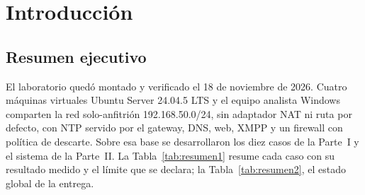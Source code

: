 \chapter{Introducción}

\section{Resumen ejecutivo}
El laboratorio quedó montado y verificado el 18 de noviembre de 2026. Cuatro máquinas virtuales Ubuntu Server 24.04.5 LTS y el equipo analista Windows comparten la red solo-anfitrión 192.168.50.0/24, sin adaptador NAT ni ruta por defecto, con NTP servido por el gateway, DNS, web, XMPP y un firewall con política de descarte. Sobre esa base se desarrollaron los diez casos de la Parte~I y el sistema de la Parte~II. La Tabla~\ref{tab:resumen1} resume cada caso con su resultado medido y el límite que se declara; la Tabla~\ref{tab:resumen2}, el estado global de la entrega.

